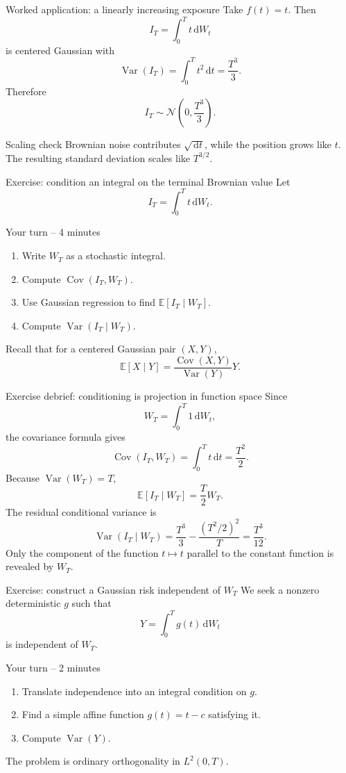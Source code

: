 \documentclass[10pt,aspectratio=169]{beamer}
\newcommand{\E}{\mathbb E}
\newcommand{\dd}{\,\mathrm d}
\DeclareMathOperator{\Var}{Var}
\DeclareMathOperator{\Cov}{Cov}
\begin{document}
\begin{frame}{Worked application: a linearly increasing exposure}
Take \(f(t)=t\). Then
\[
I_T=\int_0^T t\dd W_t
\]
is centered Gaussian with
\[
\Var(I_T)=\int_0^T t^2\dd t=\frac{T^3}{3}.
\]
Therefore
\[
\boxed{I_T\sim\mathcal N\!\left(0,\frac{T^3}{3}\right).}
\]
\begin{block}{Scaling check}
Brownian noise contributes \(\sqrt{\dd t}\), while the position grows like \(t\). The resulting standard deviation scales like \(T^{3/2}\).
\end{block}
\end{frame}

\begin{frame}{Exercise: condition an integral on the terminal Brownian value}
Let
\[
I_T=\int_0^T t\dd W_t.
\]
\begin{block}{Your turn -- 4 minutes}
\begin{enumerate}\setlength{\itemsep}{0.55em}
  \item Write \(W_T\) as a stochastic integral.
  \item Compute \(\Cov(I_T,W_T)\).
  \item Use Gaussian regression to find \(\E[I_T\mid W_T]\).
  \item Compute \(\Var(I_T\mid W_T)\).
\end{enumerate}
\end{block}
Recall that for a centered Gaussian pair \((X,Y)\),
\[
\E[X\mid Y]=\frac{\Cov(X,Y)}{\Var(Y)}Y.
\]
\end{frame}

\begin{frame}{Exercise debrief: conditioning is projection in function space}
Since
\[
W_T=\int_0^T1\dd W_t,
\]
the covariance formula gives
\[
\Cov(I_T,W_T)=\int_0^T t\dd t=\frac{T^2}{2}.
\]
Because \(\Var(W_T)=T\),
\[
\boxed{\E[I_T\mid W_T]=\frac{T}{2}W_T.}
\]
The residual conditional variance is
\[
\Var(I_T\mid W_T)
=\frac{T^3}{3}-\frac{(T^2/2)^2}{T}
=\frac{T^3}{12}.
\]
Only the component of the function \(t\mapsto t\) parallel to the constant function is revealed by \(W_T\).
\end{frame}

\begin{frame}{Exercise: construct a Gaussian risk independent of \(W_T\)}
We seek a nonzero deterministic \(g\) such that
\[
Y=\int_0^T g(t)\dd W_t
\]
is independent of \(W_T\).
\begin{block}{Your turn -- 2 minutes}
\begin{enumerate}\setlength{\itemsep}{0.55em}
  \item Translate independence into an integral condition on \(g\).
  \item Find a simple affine function \(g(t)=t-c\) satisfying it.
  \item Compute \(\Var(Y)\).
\end{enumerate}
\end{block}
The problem is ordinary orthogonality in \(L^2(0,T)\).
\end{frame}
\end{document}

